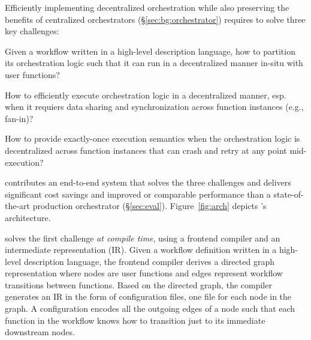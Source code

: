 Efficiently implementing decentralized orchestration while also preserving the
benefits of centralized orchestrators (\S\ref{sec:bg:orchestrator}) requires
\name{} to solve three key challenges:

\squishenum
	\item Given a workflow written in a high-level description language, how
	to partition its orchestration logic such that it can run in a
	decentralized manner in-situ with user functions?

	\item How to efficiently execute orchestration logic in a
	decentralized manner, esp. when it requiers data sharing and
	synchronization across function instances (e.g., fan-in)?

	\item How to provide exactly-once execution semantics when the
	orchestration logic is decentralized across function instances that can
	crash and retry at any point mid-execution?
\squishenumend

\name{} contributes an end-to-end system that solves the three challenges and
delivers significant cost savings and improved or comparable performance than
a state-of-the-art production orchestrator (\S\ref{sec:eval}).
Figure~\ref{fig:arch} depicts
\name{}'s architecture.  

\name{} solves the first challenge \emph{at compile time}, using a frontend
compiler and an intermediate representation (IR). Given a workflow definition
written in a high-level description language, the frontend compiler derives a
directed graph representation where nodes are user functions and edges
represent workflow transitions between functions. Based on the directed graph,
the compiler generates an IR in the form of configuration files, one file for
each node in the graph. A \name{} configuration encodes all the outgoing edges
of a node such that each function in the workflow knows how to transition just
to its immediate downstream nodes.

